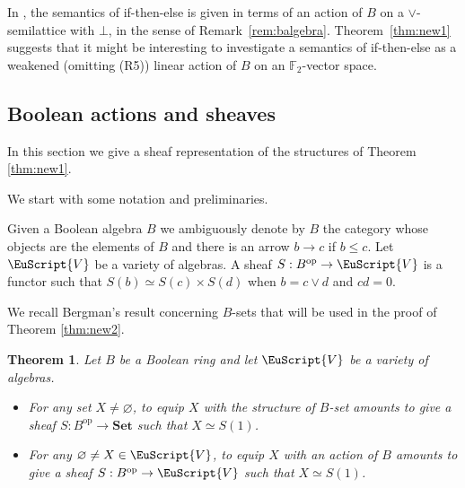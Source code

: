 \documentclass{amsart}
\numberwithin{equation}{section}
\theoremstyle{plain}
\newtheorem{theorem}{Theorem}[section]
\theoremstyle{definition}
\DeclareMathOperator{\op}{op}
\begin{document}
In \cite{M93}, the semantics of if-then-else is given in terms of an action of $B$ on a $\lor$-semilattice with $\bot$, in the sense of Remark~\ref{rem:balgebra}.
Theorem~\ref{thm:new1} suggests that it might be interesting to investigate a semantics of if-then-else as a weakened (omitting (R5)) linear action of $B$ on an $\mathbb{F}_2$-vector space. 

\subsection{Boolean actions and sheaves}
In this section we give a sheaf representation of the structures of Theorem \ref{thm:new1}.

We start with some notation and preliminaries.

Given a Boolean algebra $B$ we ambiguously denote by $B$ the category whose objects are the elements of $B$ and there is an arrow $b \to c$ if $b \le c$. 
Let $\EuScript{V}$ be a variety of algebras. 
A sheaf $S: B^{\op} \to \EuScript{V}$ is a functor 
such that $S(b) \simeq S(c) \times S(d)$ when $b=c \lor d$ and $cd=0$. 

We recall Bergman's result concerning $B$-sets that will be used in the proof of Theorem \ref{thm:new2}. 

\begin{theorem} \cite[Theorem 12]{B91}
  \label{thm:berg}
  Let $B$ be a Boolean ring and let $\EuScript{V}$ be a variety of algebras.  
  \begin{itemize}
    \item For any set $X \neq \varnothing$, to equip $X$ with the structure of $B$-set amounts to give a sheaf $S:B^{\op} \to \mathbf{Set}$ such that $X \simeq S(1)$. 
    \item For any $\varnothing \neq X \in \EuScript{V}$, to equip $X$ with an action of $B$ amounts to give a sheaf $S:B^{\op} \to \EuScript{V}$ such that $X \simeq S(1)$. 
  \end{itemize}
\end{theorem}
\end{document}
